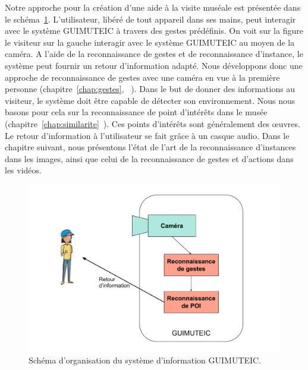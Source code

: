 Notre approche pour la création d'une aide à la visite muséale est présentée dans le schéma~\ref{fig:actioncontexte}.
L'utilisateur, libéré de tout appareil dans ses mains, peut interagir avec le système GUIMUTEIC à travers des gestes prédéfinis.
On voit sur la figure le visiteur sur la gauche interagir avec le système GUIMUTEIC au moyen de la caméra.
A l’aide de la reconnaissance de gestes et de reconnaissance d’instance, le système peut fournir un retour d’information adapté.
Nous développons donc une approche de reconnaissance de gestes avec une caméra en vue à la première personne (chapitre~\ref{chap:gestes}, ~).
Dans le but de donner des informations au visiteur, le système doit être capable de détecter son environnement. 
Nous nous basons pour cela sur la reconnaissance de point d'intérêts dans le musée (chapitre~\ref{chap:similarite}~). 
Ces points d'intérêts sont généralement des œuvres.
Le retour d'information à l'utilisateur se fait grâce à un casque audio.
Dans le chapitre suivant, nous présentons l'état de l'art de la reconnaissance d'instances dans les images, ainsi que celui de la reconnaissance de gestes et d'actions dans les vidéos.



\begin{figure}[!htb]
\includegraphics[width=\columnwidth]{figures/Boucledinteraction.pdf}%
\caption{Schéma d'organisation du système d'information GUIMUTEIC.}%
\label{fig:actioncontexte}%
\end{figure}


